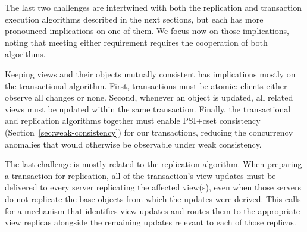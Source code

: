 
The last two challenges are intertwined with both the replication and transaction execution algorithms described in the next sections, but each has more pronounced implications on one of them.
We focus now on those implications, noting that meeting either requirement requires the cooperation of both algorithms.

Keeping views and their objects mutually consistent has implications mostly on the transactional algorithm.
First, transactions must be atomic: clients either observe all changes or none.
Second, whenever an object is updated, all related views must be updated within the same transaction.
Finally, the transactional and replication algorithms together must enable PSI+cset consistency (Section~\ref{sec:weak-consistency}) for our transactions, reducing the concurrency anomalies that would otherwise be observable under weak consistency.

The last challenge is mostly related to the replication algorithm.
When preparing a transaction for replication, all of the transaction's view updates must be delivered to every server replicating the affected view(s), even when those servers do not replicate the base objects from which the updates were derived.
This calls for a mechanism that identifies view updates and routes them to the appropriate view replicas alongside the remaining updates relevant to each of those replicas.

